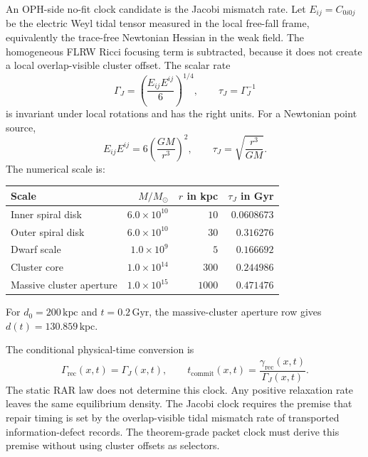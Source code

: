 \documentclass[11pt]{article}
\newcommand{\Msun}{M_{\odot}}
\begin{document}
An OPH-side no-fit clock candidate is the Jacobi mismatch rate.  Let
\(E_{ij}=C_{0i0j}\) be the electric Weyl tidal tensor measured in the local
free-fall frame, equivalently the trace-free Newtonian Hessian in the weak
field.  The homogeneous FLRW Ricci focusing term is subtracted, because it
does not create a local overlap-visible cluster offset.  The scalar rate
\begin{equation}
  \Gamma_J
  =
  \left(\frac{E_{ij}E^{ij}}{6}\right)^{1/4},
  \qquad
  \tau_J=\Gamma_J^{-1}
  \label{eq:jacobiclock}
\end{equation}
is invariant under local rotations and has the right units.  For a Newtonian
point source,
\begin{equation}
  E_{ij}E^{ij}=6\left(\frac{GM}{r^3}\right)^2,
  \qquad
  \tau_J=\sqrt{\frac{r^3}{GM}}.
\end{equation}
The numerical scale is:
\begin{center}
\begin{tabular}{@{}lrrr@{}}
\toprule
Scale & \(M/\Msun\) & \(r\) in kpc & \(\tau_J\) in Gyr \\
\midrule
Inner spiral disk & \(6.0\times10^{10}\) & \(10\) & \(0.0608673\) \\
Outer spiral disk & \(6.0\times10^{10}\) & \(30\) & \(0.316276\) \\
Dwarf scale & \(1.0\times10^9\) & \(5\) & \(0.166692\) \\
Cluster core & \(1.0\times10^{14}\) & \(300\) & \(0.244986\) \\
Massive cluster aperture & \(1.0\times10^{15}\) & \(1000\) & \(0.471476\) \\
\bottomrule
\end{tabular}
\end{center}
For \(d_0=200\,\mathrm{kpc}\) and \(t=0.2\,\mathrm{Gyr}\), the massive-cluster
aperture row gives \(d(t)=130.859\,\mathrm{kpc}\).

The conditional physical-time conversion is
\begin{equation}
  \Gamma_{\mathrm{rec}}(x,t)=\Gamma_J(x,t),
  \qquad
  t_{\mathrm{commit}}(x,t)
  =\frac{\gamma_{\mathrm{rec}}(x,t)}{\Gamma_J(x,t)} .
\end{equation}
The static RAR law does not determine this clock.  Any positive relaxation
rate leaves the same equilibrium density.  The Jacobi clock requires the
premise that repair timing is set by the overlap-visible tidal mismatch rate
of transported information-defect records.  The theorem-grade packet clock
must derive this premise without using cluster offsets as selectors.
\end{document}
